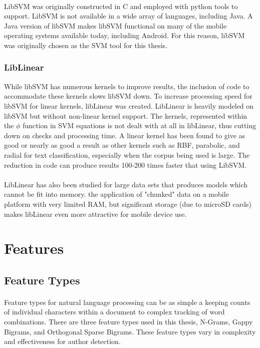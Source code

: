 			\paragraph{} LibSVM was originally constructed in C and employed with python tools to support.  LibSVM is not available in a wide array of languages, including Java.  A Java version of libSVM makes libSVM functional on many of the mobile operating systems available today, including Android.  For this reason, libSVM was originally chosen as the SVM tool for this thesis.


		\subsubsection{LibLinear}  While libSVM has numerous kernels to improve results, the inclusion of code to accommodate these kernels slows libSVM down.  To increase processing speed for libSVM for linear kernels, libLinear was created.  LibLinear is heavily modeled on libSVM but without non-linear kernel support.  The kernels, represented within the $\phi$ function in SVM equations is not dealt with at all in libLinear, thus cutting down on checks and processing time.   A linear kernel has been found to give as good or nearly as good a result as other kernels such as RBF, parabolic, and radial for text classification, especially when the corpus being used is large.  The reduction in code can produce results 100-200 times faster that using LibSVM.

			\paragraph{} LibLinear has also been studied for large data sets that produces models which cannot be fit into memory.  the application of "chunked" data on a mobile platform with very limited RAM, but significant storage (due to microSD cards) makes libLinear even more attractive for mobile device use.
			
\section {Features}

	\subsection {Feature Types}
	\paragraph{} Feature types for natural language processing can be as simple a keeping counts of individual characters within a document to complex tracking of word combinations.  There are three feature types used in this thesis, N-Grams, Gappy Bigrams, and Orthogonal Sparse Bigrams.  These feature types vary in complexity and effectiveness for author detection.

